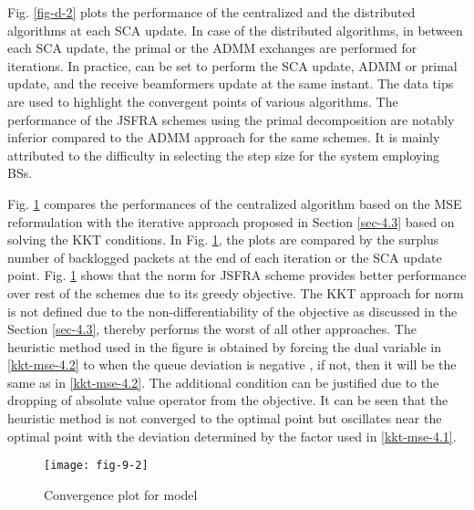 Fig. \ref{fig-d-2} plots the performance of the centralized and the distributed algorithms at each \ac{SCA} update. In case of the distributed algorithms, in between each \ac{SCA} update, the primal or the \ac{ADMM} exchanges are performed for  iterations. In practice,  can be set to perform the \ac{SCA} update, \ac{ADMM} or primal update, and the receive beamformers  update at the same instant. The data tips are used to highlight the convergent points of various algorithms. The performance of the \ac{JSFRA} schemes using the primal decomposition are notably inferior compared to the \ac{ADMM} approach for the same schemes. It is mainly attributed to the difficulty in selecting the step size for the system employing  \acp{BS}.

Fig. \ref{fig-d-3.1} compares the performances of the centralized algorithm based on the \ac{MSE} reformulation with the iterative approach proposed in Section \ref{sec-4.3} based on solving the \ac{KKT} conditions. In Fig. \ref{fig-d-3.1}, the plots are compared by the surplus number of backlogged packets at the end of each iteration or the \ac{SCA} update point. Fig. \ref{fig-d-3.1} shows that the  norm for \ac{JSFRA} scheme provides better performance over rest of the schemes due to its greedy objective. The \ac{KKT} approach for  norm is not defined due to the non-differentiability of the objective as discussed in the Section \ref{sec-4.3}, thereby performs the worst of all other approaches. The heuristic method used in the figure is obtained by forcing the dual variable  in \eqref{kkt-mse-4.2} to  when the queue deviation is negative , if not, then it will be the same as in \eqref{kkt-mse-4.2}. The additional condition can be justified due to the dropping of absolute value operator from the objective. It can be seen that the heuristic method is not converged to the optimal point but oscillates near the optimal point with the deviation determined by the factor \me{\rho} used in \eqref{kkt-mse-4.1}.
\begin{figure}
\centering
\texttt{[image: fig-9-2]}
\caption{Convergence plot for  model}
\label{fig-d-3.1}
\end{figure}

